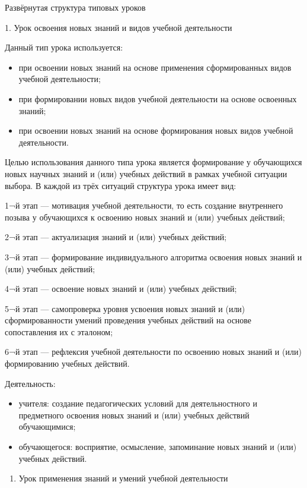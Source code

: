 \documentclass[
  11pt,
  russian,
]{book}
\providecommand{\tightlist}{%
  \setlength{\itemsep}{0pt}\setlength{\parskip}{0pt}}
\begin{document}
Развёрнутая структура типовых уроков

1. Урок освоения новых знаний и видов учебной деятельности

Данный тип урока используется:

\begin{itemize}
\item
  при освоении новых знаний на основе применения сформированных видов учебной деятельности;
\item
  при формировании новых видов учебной деятельности на основе освоенных знаний;
\item
  при освоении новых знаний на основе формирования новых видов учебной деятельности.
\end{itemize}

Целью использования данного типа урока является формирование у обучающихся новых научных знаний и (или) учебных действий в рамках учебной ситуации выбора. В каждой из трёх ситуаций структура урока имеет вид:

1¬й этап --- мотивация учебной деятельности, то есть создание внутреннего позыва у обучающихся к освоению новых знаний и (или) учебных действий;

2¬й этап --- актуализация знаний и (или) учебных действий;

3¬й этап --- формирование индивидуального алгоритма освоения новых знаний и (или) учебных действий;

4¬й этап --- освоение новых знаний и (или) учебных действий;

5¬й этап --- самопроверка уровня усвоения новых знаний и (или) сформированности умений проведения учебных действий на основе сопоставления их с эталоном;

6¬й этап --- рефлексия учебной деятельности по освоению новых знаний и (или) формированию учебных действий.

Деятельность:

\begin{itemize}
\item
  учителя: создание педагогических условий для деятельностного и предметного освоения новых знаний и (или) учебных действий обучающимися;
\item
  обучающегося: восприятие, осмысление, запоминание новых знаний и (или) учебных действий.
\end{itemize}

\begin{enumerate}
\def\labelenumi{\arabic{enumi}.}
\setcounter{enumi}{1}
\tightlist
\item
  Урок применения знаний и умений учебной деятельности
\end{enumerate}
\end{document}
